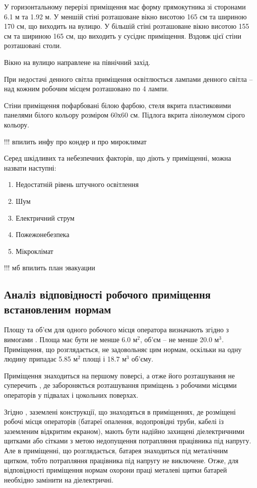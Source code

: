 \documentclass[a4paper,12pt]{article}
\begin{document}
У горизонтальному перерізі приміщення має форму прямокутника зі сторонами 6.1 м та 1.92 м. У меншій стіні розташоване вікно висотою 165 см та шириною 170 см, що виходить на вулицю. У більшій стіні розташоване вікно  висотою 155 см та шириною 165 см, що виходить у сусіднє приміщення. Вздовж цієї стіни розташовані столи.

Вікно на вулицю направлене на північний захід.

При недостачі денного світла приміщення освітлюється лампами денного світла -- над кожним робочим місцем розташовано по 4 лампи.

Стіни приміщення пофарбовані білою фарбою, стеля вкрита пластиковими панелями білого кольору розміром 60х60 см. Підлога вкрита лінолеумом сірого кольору.

!!! впилить инфу про кондер  и про мироклимат

Серед шкідливих та небезпечних факторів, що діють у приміщенні, можна назвати наступні:
\begin{enumerate}
\item Недостатній рівень штучного освітлення 
\item Шум
\item Електричний струм
\item Пожежонебезпека
\item Мікроклімат
\end{enumerate}

!!! мб впилить план эвакуации
\subsection{Аналіз відповідності робочого приміщення встановленим нормам}

Площу  та  об'єм  для  одного  робочого місця оператора визначають згідно з вимогами \cite{sanpin798}. Площа має бути не менше 6.0 $\text{м}^2$, об'єм -- не менше 20.0 $\text{м}^3$. Приміщення, що розглядається, не задовольняє цим нормам, оскільки на одну людину припадає 5.85 $\text{м}^2$ площі і 18.7 $\text{м}^3$ об’єму.

Приміщення знаходиться на першому поверсі, а отже його розташування не суперечить \cite{npaop1210}, де забороняється розташування приміщень з робочими місцями  операторів у підвалах і цокольних поверхах.

Згідно \cite{npaop1210}, заземлені конструкції, що знаходяться в приміщеннях, де розміщені робочі місця операторів (батареї опалення,  водопровідні труби, кабелі із заземленим відкритим екраном), мають бути надійно захищені діелектричними щитками або сітками  з  метою  недопущення потрапляння працівника під напругу. Але в приміщенні, що розглядається, батарея знаходиться під металічним щитком, тобто потрапляння працівника під напругу не виключене. Отже, для відповідності приміщення нормам охорони праці металеві щитки батарей необхідно замінити на діелектричні.
\end{document}
